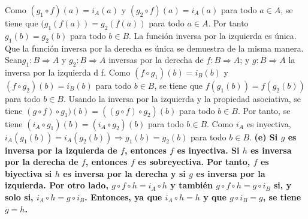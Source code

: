 \documentclass{article}
\begin{document}
Como \((g_1 \circ f)(a)= i_A(a)\) y \((g_2 \circ f )(a)= i_A(a)\) para todo \(a \in A\), se tiene que \((g_1  (f(a))=g_2 (f (a))\) para todo \(a \in A\). Por tanto \(g_1(b)= g_2(b)\) para todo \(b\in B\). La función inversa por la izquierda es única.
\newline
Que la función inversa por la derecha es única se demuestra de la misma manera. Sean\( g_1: B\Rightarrow A\) y \(g_2: B \Rightarrow A\) inversas por la derecha de \(f: B \Rightarrow A \); y   \(g: B \Rightarrow A\) la inversa por la izquierda d f. Como \((f \circ g_1)(b)= i_B(b)\) y \(( f \circ g_2)(b)= i_B(b)\) para todo \(b \in B\), se tiene que \(f (g_1(b))=f(g_2(b))\) para todo \(b \in B\). Usando la inversa por la izquierda y la propiedad asociativa, se tiene \((g \circ f )\circ g_1)(b)= ((g\circ f) \circ g_2)(b)\) para todo \(b\in B\). Por tanto, se tiene \((i_A \circ g_1)(b)= ( i_A \circ g_2)(b)\) para todo \(b\in B\). Como \(i_A \) es  inyectiva, \(i_A ( g_1(b))= i_A( g_2(b)) \Rightarrow g_1(b)=  g_2(b) \) para todo \(b\in B\).
\newline
\bf (e) \rm Si \(g\) es inversa por la izquierda de \(f\), entonces \(f\) es inyectiva. Si \(h\) es inversa por la derecha de \(f\), entonces \(f\) es sobreyectiva. Por tanto, \(f\) es biyectiva si \(h\) es inversa por la derecha y si \(g\) es inversa por la izquierda. Por otro lado, \(g \circ f \circ h=i_A \circ h\) y también \(g \circ f \circ h = g \circ i_B\) si, y solo si, \( i_A \circ h = g \circ i_B \). Entonces, ya que \( i_A \circ h = h\)  y que \(g \circ i_B = g\), se tiene \(g=h\).
%
%
\end{document}
